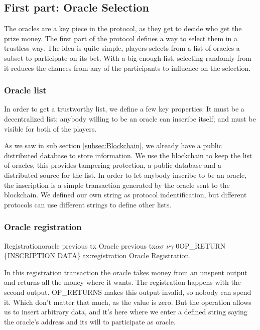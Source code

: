 \subsection{First part: Oracle Selection}

The oracles are a key piece in the protocol, as they get to decide who get
  the prize money.
The first part of the protocol defines a way to select them in a trustless
  way.
The idea is quite simple, players selects from a list of oracles a subset
  to participate on its bet.
With a big enough list, selecting randomly from it reduces the
  chances from any of the participants to influence on the selection.

\subsubsection{Oracle list}

In order to get a trustworthy list, we define a few key properties:
It must be a decentralized list; anybody willing to be an oracle can inscribe
  itself; and must be visible for both of the players.

As we saw in sub section \ref{subsec:Blockchain}, we already have a
  public distributed database to store information.
We use the blockchain to keep the list of oracles, this provides tampering
  protection, a public database and a distributed source for the list.
In order to let anybody inscribe to be an oracle, the inscription is a simple
 transaction generated by the oracle sent to the blockchain.
We defined our own string as protocol indentification, but different protocols
  can use different strings to define other lists.

\subsubsection{Oracle registration}

\transaction
    {Registration}{oracle previous tx}
      {Oracle previous tx}{$\alpha$}{$\sigma$}
      \stopinputs
      {$\nu$}{$\gamma$}
      {$0$}{OP\_RETURN \{INSCRIPTION DATA\}}
      \stopoutputs
      {tx:registration}
      {Oracle Registration.}

In this registration transaction the oracle takes money from an unspent output
  and returns all the money where it wants. The registration happens with the
  second output. OP_RETURNS makes this output invalid, so nobody can spend it.
Which don't matter that much, as the value is zero. But the operation allows
  us to insert arbitrary data, and it's here where we enter a defined string
  saying the oracle's address and its will to participate as oracle.

